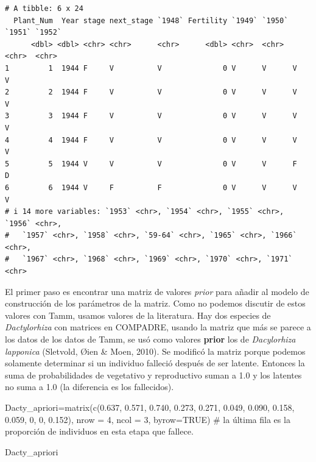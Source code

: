 \documentclass[
  12pt,
  letterpaper,
]{book}
\newenvironment{Shaded}{\begin{snugshade}}{\end{snugshade}}
\newcommand{\AttributeTok}[1]{\textcolor[rgb]{0.40,0.45,0.13}{#1}}
\newcommand{\CommentTok}[1]{\textcolor[rgb]{0.37,0.37,0.37}{#1}}
\newcommand{\ConstantTok}[1]{\textcolor[rgb]{0.56,0.35,0.01}{#1}}
\newcommand{\DecValTok}[1]{\textcolor[rgb]{0.68,0.00,0.00}{#1}}
\newcommand{\FloatTok}[1]{\textcolor[rgb]{0.68,0.00,0.00}{#1}}
\newcommand{\FunctionTok}[1]{\textcolor[rgb]{0.28,0.35,0.67}{#1}}
\newcommand{\NormalTok}[1]{\textcolor[rgb]{0.00,0.23,0.31}{#1}}
\newcommand{\OtherTok}[1]{\textcolor[rgb]{0.00,0.23,0.31}{#1}}
\begin{document}
\begin{verbatim}
# A tibble: 6 x 24
  Plant_Num  Year stage next_stage `1948` Fertility `1949` `1950` `1951` `1952`
      <dbl> <dbl> <chr> <chr>      <chr>      <dbl> <chr>  <chr>  <chr>  <chr> 
1         1  1944 F     V          V              0 V      V      V      V     
2         2  1944 F     V          V              0 V      V      V      V     
3         3  1944 F     V          V              0 V      V      V      V     
4         4  1944 F     V          V              0 V      V      V      V     
5         5  1944 V     V          V              0 V      V      F      D     
6         6  1944 V     F          F              0 V      V      V      V     
# i 14 more variables: `1953` <chr>, `1954` <chr>, `1955` <chr>, `1956` <chr>,
#   `1957` <chr>, `1958` <chr>, `59-64` <chr>, `1965` <chr>, `1966` <chr>,
#   `1967` <chr>, `1968` <chr>, `1969` <chr>, `1970` <chr>, `1971` <chr>
\end{verbatim}

El primer paso es encontrar una matriz de valores \emph{prior} para
añadir al modelo de construcción de los parámetros de la matriz. Como no
podemos discutir de estos valores con Tamm, usamos valores de la
literatura. Hay dos especies de \emph{Dactylorhiza} con matrices en
COMPADRE, usando la matriz que más se parece a los datos de los datos de
Tamm, se usó como valores \textbf{prior} los de \emph{Dacylorhiza
lapponica} (Sletvold, Øien \& Moen, 2010). Se modificó la matriz porque
podemos solamente determinar si un individuo falleció después de ser
latente. Entonces la suma de probabilidades de vegetativo y reproductivo
suman a 1.0 y los latentes no suma a 1.0 (la diferencia es los
fallecidos).

\begin{Shaded}
\begin{Highlighting}[]
\NormalTok{Dacty\_apriori}\OtherTok{=}\FunctionTok{matrix}\NormalTok{(}\FunctionTok{c}\NormalTok{(}\FloatTok{0.637}\NormalTok{, }\FloatTok{0.571}\NormalTok{, }\FloatTok{0.740}\NormalTok{,}
                       \FloatTok{0.273}\NormalTok{, }\FloatTok{0.271}\NormalTok{, }\FloatTok{0.049}\NormalTok{,}
                       \FloatTok{0.090}\NormalTok{, }\FloatTok{0.158}\NormalTok{, }\FloatTok{0.059}\NormalTok{,}
                       \DecValTok{0}\NormalTok{,     }\DecValTok{0}\NormalTok{,     }\FloatTok{0.152}\NormalTok{),  }
              \AttributeTok{nrow =} \DecValTok{4}\NormalTok{, }\AttributeTok{ncol =} \DecValTok{3}\NormalTok{, }
              \AttributeTok{byrow=}\ConstantTok{TRUE}\NormalTok{) }\CommentTok{\# la última fila es la proporción de individuos en esta etapa que fallece. }

\NormalTok{Dacty\_apriori}
\end{Highlighting}
\end{Shaded}
\end{document}
